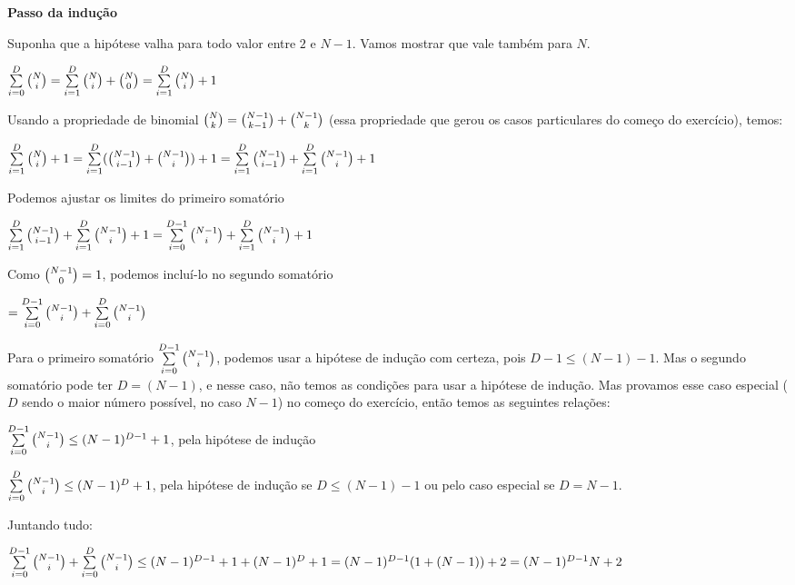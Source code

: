 \textbf{Passo da indução}

Suponha que a hipótese valha para todo valor entre $2$ e $N -1$. Vamos mostrar que vale também para $N$.

$\sum\limits_{i=0}^D {{N} \choose {i}} = \sum\limits_{i=1}^D {{N} \choose {i}} + {{N} \choose {0}} = \sum\limits_{i=1}^D {{N} \choose {i}} + 1$

Usando a propriedade de binomial ${{N} \choose {k}} = {{N-1} \choose {k-1}} + {{N-1} \choose {k}}$ (essa propriedade que gerou os casos particulares do começo do exercício), temos:

$\sum\limits_{i=1}^D {{N} \choose {i}} + 1 = \sum\limits_{i=1}^D ({{N-1} \choose {i-1}} + {{N-1} \choose {i}}) + 1 = \sum\limits_{i=1}^D {{N-1} \choose {i-1}} + \sum\limits_{i=1}^D {{N-1} \choose {i}} + 1$

Podemos ajustar os limites do primeiro somatório

$\sum\limits_{i=1}^D {{N-1} \choose {i-1}} + \sum\limits_{i=1}^D {{N-1} \choose {i}} + 1 =
\sum\limits_{i=0}^{D-1} {{N-1} \choose {i}} + \sum\limits_{i=1}^D {{N-1} \choose {i}} + 1$

Como ${{N-1} \choose {0}} = 1$, podemos incluí-lo no segundo somatório

$= \sum\limits_{i=0}^{D-1} {{N-1} \choose {i}} + \sum\limits_{i=0}^D {{N-1} \choose {i}}$

\vspace{7pt}

Para o primeiro somatório $\sum\limits_{i=0}^{D-1} {{N-1} \choose {i}}$, podemos usar a hipótese de indução com certeza, pois $D - 1 \le (N - 1) - 1$. Mas o segundo somatório pode ter $D = (N - 1)$, e nesse caso, não temos as condições para usar a hipótese de indução. Mas provamos esse caso especial ($D$ sendo o maior número possível, no caso $N -1$) no começo do exercício, então temos as seguintes relações:

$\sum\limits_{i=0}^{D-1} {{N-1} \choose {i}} \le (N-1)^{D-1} + 1$, pela hipótese de indução

$\sum\limits_{i=0}^D {{N-1} \choose {i}} \le (N-1)^D + 1$, pela hipótese de indução se $D \le (N - 1) - 1$ ou pelo caso especial se $D = N - 1$.

\vspace{7pt}

Juntando tudo:

$\sum\limits_{i=0}^{D-1} {{N-1} \choose {i}} + \sum\limits_{i=0}^D {{N-1} \choose {i}} 
\le
(N-1)^{D-1} + 1 + (N-1)^D + 1 = (N-1)^{D-1} (1 + (N -1)) + 2 = (N-1)^{D-1} N + 2
$

